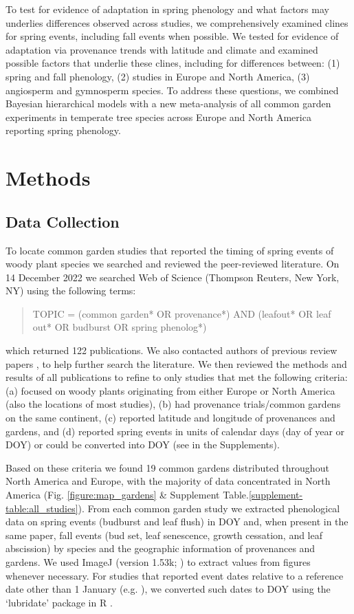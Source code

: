 \documentclass{article}
\begin{document}
To test for evidence of adaptation in spring phenology and what factors may underlies differences observed across studies, we comprehensively examined clines for spring events, including fall events when possible. We tested for evidence of adaptation via provenance trends with latitude and climate and examined possible factors that underlie these clines, including for differences between: (1) spring and fall phenology, (2) studies in Europe and North America, (3) angiosperm and gymnosperm species. To address these questions, we combined Bayesian hierarchical models with a new meta-analysis of all common garden experiments in temperate tree species across Europe and North America reporting spring phenology. 

\section{Methods}
\subsection{Data Collection}
To locate common garden studies that reported the timing of spring events of woody plant species we searched and reviewed the peer-reviewed literature. On 14 December 2022 we searched Web of Science (Thompson Reuters, New York, NY) using the following terms:
\begin{quote}
TOPIC = (common garden* OR provenance*) AND (leafout* OR leaf out* OR budburst OR spring phenolog*)
\end{quote}
which returned 122 publications. We also contacted authors of previous review papers \citep{AitkenBemmels16, Alberto13}, to help further search the literature. We then reviewed the methods and results of all publications to refine to only studies that met the following criteria: (a) focused on woody plants originating from either Europe or North America (also the locations of most studies), (b) had provenance trials/common gardens on the same continent, (c) reported latitude and longitude of provenances and gardens, and (d) reported spring events in units of calendar days (day of year or DOY) or could be converted into DOY (see  in the Supplements).

Based on these criteria we found 19 common gardens distributed throughout North America and Europe, with the majority of data concentrated in North America (Fig. \ref{figure:map_gardens} \& Supplement Table.\ref{supplement-table:all_studies}). From each common garden study we extracted phenological data on spring events (budburst and leaf flush) in DOY and, when present in the same paper, fall events (bud set, leaf senescence, growth cessation, and leaf abscission) by species and the geographic information of provenances and gardens. We used ImageJ (version 1.53k; \citealp{schneider_rasband_eliceiri_2012}) to extract values from figures whenever necessary. For studies that reported event dates relative to a reference date other than 1 January (e.g. \citealp{Rehfeldt1994}), we converted such dates to DOY using the `lubridate' package in R \citep{Grolemund11}. 
\end{document}
